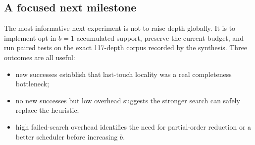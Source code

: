 \subsection{A focused next milestone}

The most informative next experiment is not to raise depth globally.  It is to
implement opt-in $b=1$ accumulated support, preserve the current budget, and run
paired tests on the exact 117-depth corpus recorded by the synthesis.  Three
outcomes are all useful:
\begin{itemize}
\item new successes establish that last-touch locality was a real completeness
      bottleneck;
\item no new successes but low overhead suggests the stronger search can safely
      replace the heuristic;
\item high failed-search overhead identifies the need for partial-order
      reduction or a better scheduler before increasing $b$.
\end{itemize}
